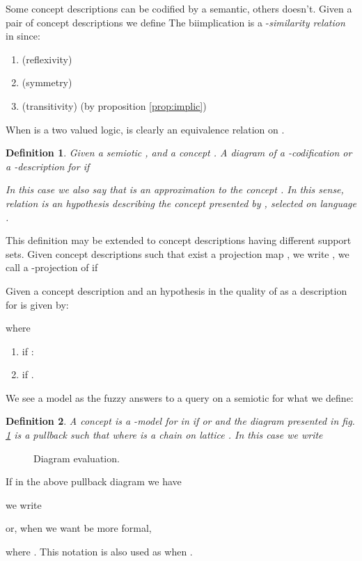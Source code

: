 \documentclass[oribibl]{llncs}
\newtheorem{defn}{Definition}
\begin{document}
Some concept descriptions can be codified by a semantic, others doesn't. Given a pair of concept descriptions 
we define
 The biimplication  is a -\emph{similarity
relation} in  since:
\begin{enumerate}
  \item  (reflexivity)
  \item  (symmetry)
  \item 
  (transitivity) (by proposition \ref{prop:implic})
\end{enumerate}
When  is a two valued logic,  is clearly an equivalence relation
on .

\begin{defn}
Given a semiotic , and a concept . A diagram  of a -codification or a -description for  if

In this case we also say that  is an approximation to the concept . In this sense, relation  is an hypothesis describing the concept presented by , selected on language .
\end{defn}

This definition may be extended to concept descriptions having different support sets. Given concept descriptions
 such that exist a projection map , we write , we call  a -projection of  if


Given a concept description  and an hypothesis  in  the quality of  as a description for  is given by:

where
\begin{enumerate}
  \item  if :
  \item  if .
\end{enumerate}

We see a model as the fuzzy answers to a query on a semiotic for what we define:
\begin{defn}\label{def:lambda model}
A concept  is a -model for  in  if  or  and the diagram presented in fig. \ref{lambdamodel}
is a pullback such that  where  is a chain on lattice . In this case we write

\end{defn}
\begin{figure}[h]

\caption{Diagram evaluation.}\label{lambdamodel}
\end{figure}

If in the above pullback diagram we have

we write

or, when we want be more formal,

where . This notation is also used as  when .
\end{document}

